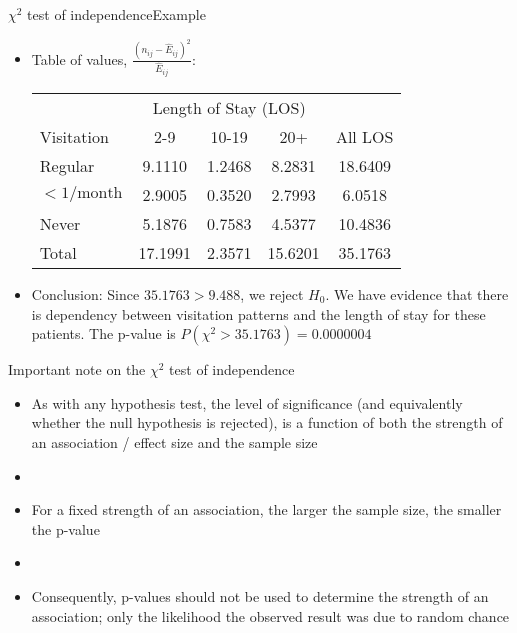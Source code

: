 \documentclass[xcolor=dvipsnames]{beamer}
\begin{document}
\begin{frame}{$\chi^2$ test of independence}{Example}
\begin{itemize}
	\item Table of values, $\frac{(n_{ij}-\hat{E}_{ij})^2}{\hat{E}_{ij}}$:
	\vspace{1mm}
	{\scriptsize
		\begin{center}
			\begin{tabular}{|l|ccc|c|}
				\hline
				& \multicolumn{3}{c|}{Length of Stay (LOS)} & \\
				Visitation & 2-9 & 10-19 & 20+ & All LOS \\ \hline
				Regular           &9.1110 &1.2468 &8.2831 & 18.6409\\
				$<1/\text{month}$ &2.9005 &0.3520 &2.7993 & 6.0518\\
				Never             &5.1876 &0.7583 &4.5377 & 10.4836\\ \hline
				Total & 17.1991 & 2.3571 &15.6201& 35.1763 \\ \hline
			\end{tabular}
	\end{center}}  \pause
	\vspace{2mm}
	\item Conclusion: Since $35.1763 > 9.488$, we reject $H_0$. We have evidence that there is dependency between visitation patterns and the length of stay for these patients. The p-value is $P(\chi^2 > 35.1763) =0.0000004$
\end{itemize}
\end{frame}

\begin{frame}{Important note on the $\chi^2$ test of independence}
	\begin{itemize}
		\item As with any hypothesis test, the level of significance (and equivalently whether the null hypothesis is rejected), is a function of both the strength of an association / effect size and the sample size  \pause
		\item[]
		\item For a fixed strength of an association, the larger the sample size, the smaller the p-value  \pause
		\item[]
		\item Consequently, p-values should not be used to determine the strength of an association; only the likelihood the observed result was due to random chance
	\end{itemize}
\end{frame}
\end{document}
